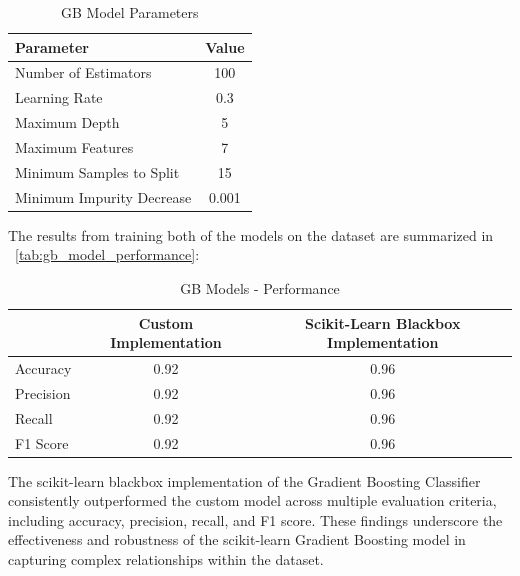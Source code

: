 \begin{table}[H]
  \centering
  \begin{tabular}{lc}
    \toprule
    \textbf{Parameter}        & \textbf{Value} \\
    \midrule
    Number of Estimators      & 100            \\
    Learning Rate             & 0.3            \\
    Maximum Depth             & 5              \\
    Maximum Features          & 7              \\
    Minimum Samples to Split  & 15             \\
    Minimum Impurity Decrease & 0.001          \\
    \bottomrule
  \end{tabular}
  \caption{GB Model Parameters}
  \label{tab:gb_modelparams}
\end{table}

The results from training both of the models on the dataset are summarized in ~\autoref{tab:gb_model_performance}:

\begin{table}[H]
  \centering
  \begin{tabular}{lcc}
    \toprule
              & \textbf{Custom Implementation} & \textbf{Scikit-Learn Blackbox Implementation} \\
    \midrule
    Accuracy  & 0.92                           & 0.96                                          \\
    Precision & 0.92                           & 0.96                                          \\
    Recall    & 0.92                           & 0.96                                          \\
    F1 Score  & 0.92                           & 0.96                                          \\
    \bottomrule
  \end{tabular}
  \caption{GB Models - Performance}
  \label{tab:gb_model_performance}
\end{table}

The scikit-learn blackbox implementation of the Gradient Boosting Classifier consistently outperformed the custom model across multiple evaluation criteria, including accuracy, precision, recall, and F1 score. These findings underscore the effectiveness and robustness of the scikit-learn Gradient Boosting model in capturing complex relationships within the dataset.
